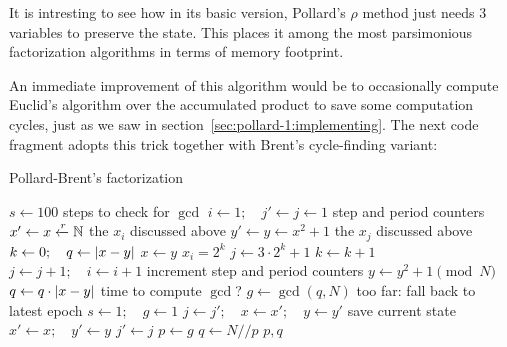 \begin{remark}
  It is intresting to see how in its basic version, Pollard's $\rho$
  method just needs 3 variables  to preserve the
  state. This places it among the most parsimonious factorization algorithms in
  terms of memory footprint.
\end{remark}

An immediate improvement of this algorithm would be to occasionally compute Euclid's
algorithm over the accumulated product to save some computation cycles, just as
we saw in section~\ref{sec:pollard-1:implementing}. The next code fragment
adopts this trick together with Brent's cycle-finding variant:

\begin{algorithm}
  \caption{Pollard-Brent's factorization \label{alg:pollardrho}}
  \begin{algorithmic}[1]
    \State $s \gets 100$
    \Comment steps to check for $\gcd$
    \State $i \gets 1; \quad j' \gets j \gets 1$
    \Comment step and period counters
    \State $x' \gets x \xleftarrow{r} \mathbb{N}$
    \Comment the $x_i$ discussed above
    \State $y' \gets y \gets x^2 + 1$
    \Comment the $x_j$ discussed above
    \State $k \gets 0; \quad q \gets \left|x-y\right|$
      \State $x \gets y$ \Comment $x_i = 2^k$
      \State $j \gets 3 \cdot 2^{k} + 1$
      \State $k \gets k+1$
        \State $j \gets j+1; \quad i \gets i+1$
        \Comment increment step and period counters
        \State $y \gets y^2 + 1 \pmod{N}$
        \State $q \gets q \cdot \left|x - y\right|$
         \Comment time to compute $\gcd$?
          \State $g \gets \gcd(q, N)$
            \Comment too far: fall back to latest epoch
            \State $s \gets 1; \quad  g \gets 1$
            \State $j \gets j'; \quad x \gets x'; \quad y \gets y'$
            \Comment save current state
            \State $x' \gets x; \quad y' \gets y$
            \State $j' \gets j$
          \Else
            \State $p \gets g$
            \State $q \gets N//p$
            \State \Return $p, q$
          \EndIf
        \EndIf
      \EndWhile
    \EndWhile
    \EndFunction
  \end{algorithmic}
\end{algorithm}


